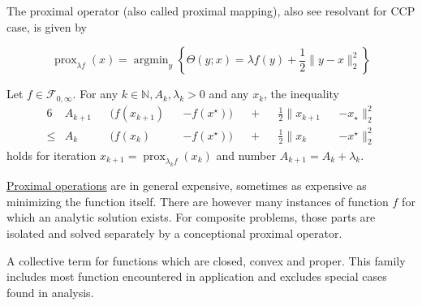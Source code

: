 \documentclass{article}
\DeclareMathOperator{\prox}{prox}
\DeclareMathOperator*{\argmin}{argmin}
\begin{document}
\begin{definition}[label=f6izn8iw, name=Proximal Operator]
	The proximal operator (also called proximal mapping), also see resolvant for CCP case, is given by 

	\[
		\prox_{\lambda f}(x) = \argmin_y \left\{ \Theta(y; x) = \lambda f(y) + \frac{1}{2}\lVert y - x\rVert_2^2\right\}
	\]

    \begin{theorem}[label=78req5r7, name=Convergence with Lyapunov Analysis]
        Let \( f\in\mathcal{F}_{0,\infty} \). For any \( k\in\mathbb{N}, A_k, \lambda_k > 0\) and any \( x_k \), the inequality
        \begin{alignat*}{6}
            &A_{k+1}&&(f(x_{k+1}) &&- f(x^\star)) &&+ &&\frac{1}{2}\lVert x_{k+1} &&- x_\star\rVert^2_2  \\
            \leq &A_k&&(f(x_k)   &&- f(x^\star)) &&+ &&\frac{1}{2}\lVert x_k   &&- x^\star\rVert_2^2
        \end{alignat*}
        holds for iteration \( x_{k+1} = \prox_{\lambda_kf}(x_k) \) and number \(A_{k+1}= A_k + \lambda_k\).
    \end{theorem}

    \begin{remark}[label=hnns6j86, name=Computation complexity]
	\hyperref[f6izn8iw]{Proximal operations} are in general expensive, sometimes as expensive as
        minimizing the function itself. There are however many instances of
        function \( f \) for which an analytic solution exists. For composite
        problems, those parts are isolated and solved separately by a
        conceptional proximal operator.
    \end{remark}
\end{definition}
\begin{definition}[label=g87jzem_, name=Closed Convex Proper]
		A collective term for functions which are closed, convex and proper. This family includes most function encountered in application and excludes special cases found in analysis.
\end{definition}
\end{document}
